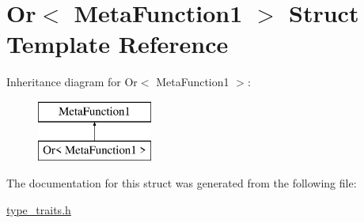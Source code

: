 \hypertarget{struct_or_3_01_meta_function1_01_4}{}\section{Or$<$ Meta\+Function1 $>$ Struct Template Reference}
\label{struct_or_3_01_meta_function1_01_4}
Inheritance diagram for Or$<$ Meta\+Function1 $>$\+:\begin{figure}[H]
\begin{center}
\leavevmode
\includegraphics[height=2.000000cm]{struct_or_3_01_meta_function1_01_4}
\end{center}
\end{figure}


The documentation for this struct was generated from the following file\+:\begin{DoxyCompactItemize}
\item 
\hyperlink{type__traits_8h}{type\+\_\+traits.\+h}\end{DoxyCompactItemize}

